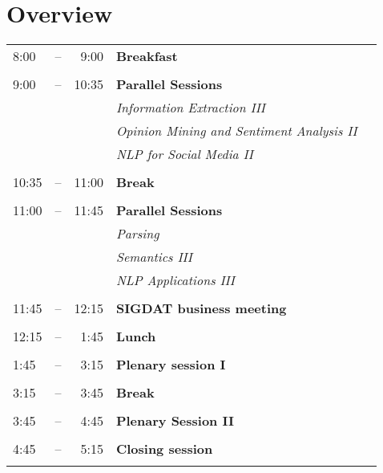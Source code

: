 \documentclass[twoside,makeidx]{book}
\begin{document}
\section*{Overview}
\begin{tabular}{ l @{} c @{} r l l }
8:00 & -- & 9:00 & \textbf{Breakfast} \hfill \\
\\
9:00 & -- & 10:35 & \textbf{Parallel Sessions} \hfill \\
 & & & \textit{Information Extraction III} \\
 & & & \textit{Opinion Mining and Sentiment Analysis II} \\
 & & & \textit{NLP for Social Media II} \\
\\
10:35 & -- & 11:00 & \textbf{Break} \hfill \\
\\
11:00 & -- & 11:45 & \textbf{Parallel Sessions} \hfill \\
 & & & \textit{Parsing} \\
 & & & \textit{Semantics III} \\
 & & & \textit{NLP Applications III} \\
\\
11:45 & -- & 12:15 & \textbf{SIGDAT business meeting} \hfill \\
\\
12:15 & -- & 1:45 & \textbf{Lunch} \hfill \\
\\
1:45 & -- & 3:15 & \textbf{Plenary session I} \hfill \\
\\
3:15 & -- & 3:45 & \textbf{Break} \hfill \\
\\
3:45 & -- & 4:45 & \textbf{Plenary Session II} \hfill \\
\\
4:45 & -- & 5:15 & \textbf{Closing session} \hfill \\
\\
\end{tabular}
\clearpage
\end{document}
